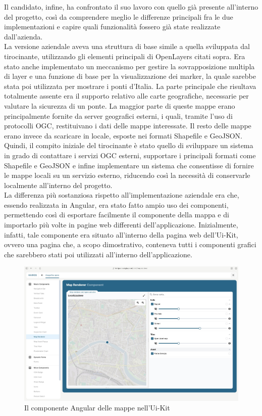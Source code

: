 Il candidato, infine, ha confrontato il suo lavoro con quello già presente all'interno del progetto, così da comprendere meglio le differenze principali fra le due implementazioni e capire quali funzionalità fossero già state realizzate dall'azienda.
\\La versione aziendale aveva una struttura di base simile a quella sviluppata dal tirocinante, utilizzando gli elementi principali di OpenLayers citati sopra. Era stato anche implementato un meccanismo per gestire la sovrapposizione multipla di layer e una funzione di base per la visualizzazione dei marker, la quale sarebbe stata poi utilizzata per mostrare i ponti d'Italia. La parte principale che risultava totalmente assente era il supporto relativo alle carte geografiche, necessarie per valutare la sicurezza di un ponte. La maggior parte di queste mappe erano principalmente fornite da server geografici esterni, i quali, tramite l'uso di protocolli OGC, restituivano i dati delle mappe interessate. Il resto delle mappe erano invece da scaricare in locale, esposte nei formati Shapefile e GeoJSON.
\\Quindi, il compito iniziale del tirocinante è stato quello di sviluppare un sistema in grado di contattare i servizi OGC esterni, supportare i principali formati come Shapefile e GeoJSON e infine implementare un sistema che consentisse di fornire le mappe locali su un servizio esterno, riducendo così la necessità di conservarle localmente all'interno del progetto.
\medskip  
\\La differenza più sostanziosa rispetto all'implementazione aziendale era che, essendo realizzata in Angular, era stato fatto ampio uso dei componenti, permettendo così di esportare facilmente il componente della mappa e di importarlo più volte in pagine web differenti dell'applicazione. Inizialmente, infatti, tale componente era situato all'interno della pagina web dell'Ui-Kit, ovvero una pagina che, a scopo dimostrativo, conteneva tutti i componenti grafici che sarebbero stati poi utilizzati all'interno dell'applicazione.
\begin{figure}[htbp]
    \centering
    \includegraphics[width=1\textwidth]{Tesi/images/Capitolo4/MapComponent.jpg}
    \caption{Il componente Angular delle mappe nell'Ui-Kit}
    \label{fig:MapComponent}
\end{figure}
